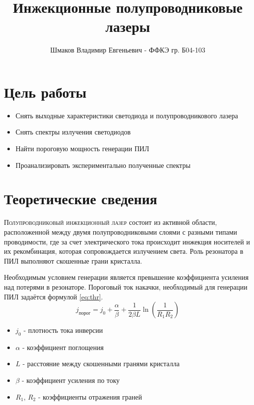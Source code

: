 \documentclass[a4paper, 12pt]{extarticle}
\title{\textcolor{main_title}{Инжекционные полупроводниковые лазеры}}
\author{Шмаков Владимир Евгеньевич - ФФКЭ гр. Б04-103}
\begin{document}
\maketitle



\section*{\textcolor{header}{Цель работы}}
\begin{itemize}
    \item Снять выходные характеристики светодиода и полупроводникового лазера
    \item Снять спектры излучения светодиодов
    \item Найти пороговую мощность генерации ПИЛ
    \item Проанализировать экспериментально полученные спектры
\end{itemize}
\section*{\textcolor{header}{Теоретические сведения}}

\lettrine{\textcolor{defenition}{П}}{\textcolor{defenition}{олупроводниковый инжекционный лазер}} состоит из активной области, расположенной между двумя полупроводниковыми слоями с разными типами проводимости, где за счет электрического тока происходит инжекция носителей и их рекомбинация, которая сопровождается излучением  света. Роль резонатора в ПИЛ выполняют скошенные грани кристалла.

Необходимым условием генерации является превышение коэффициента усиления над потерями в резонаторе. Пороговый ток накачки, необходимый для генерации ПИЛ задаётся формулой \ref{eq:thr}.
\begin{equation}
    j_{\text{порог}} = j_0 + \frac{\alpha}{\beta} + \frac{1}{2 \beta L} \operatorname{ln}\left( \frac{1}{R_1 R_2}\right)
    \label{eq:thr}
\end{equation}
\begin{itemize}
    \item $j_0$ - плотность тока инверсии
    \item $\alpha$ - коэффициент поглощения
    \item $L$ - расстояние между скошенными гранями кристалла
    \item $\beta$ - коэффициент усиления по току
    \item $R_1$, $R_2$ - коэффициенты отражения граней
\end{itemize}
\end{document}
